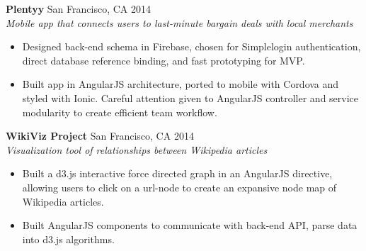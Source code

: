 \documentclass[11pt]{res} %
\begin{document}
\begin{resume}
\begin{itemize}
\end{itemize}
%
\vspace{-6pt}
\textbf{Plentyy}                    \hfill San Francisco, CA 2014 \\
\textit {Mobile app that connects users to last-minute bargain deals with local merchants}
\vspace{2pt}
\begin{itemize} \itemsep -1pt 
  \item Designed back-end schema in Firebase, chosen for Simplelogin authentication, direct database reference binding, and fast prototyping for MVP.
  \item Built app in AngularJS architecture, ported to mobile with Cordova and styled with Ionic. Careful attention given to AngularJS controller and service modularity to create efficient team workflow.
\end{itemize}
%
\vspace{-6pt}
\textbf{WikiViz Project} \hfill San Francisco, CA 2014 \\
\textit{Visualization tool of relationships between Wikipedia articles}
\vspace{2pt}
\begin{itemize} \itemsep -1pt 
  \item Built a d3.js interactive force directed graph in an AngularJS directive, allowing users to click on a url-node to create an expansive node map of Wikipedia articles.
  \item Built AngularJS components to communicate with back-end API, parse data into d3.js algorithms. 
\end{itemize}
%

\vspace{-6pt}

\end{resume}
\end{document}
